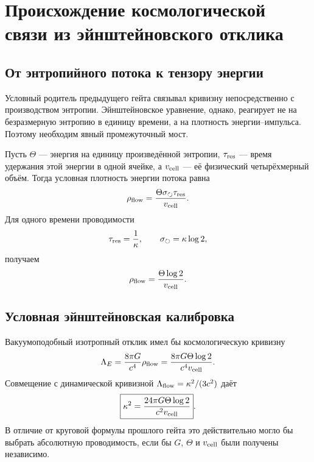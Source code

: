 \chapter{Происхождение космологической связи из эйнштейновского отклика}
\label{ch:v10-cosmological-einstein-response}

\section{От энтропийного потока к тензору энергии}

Условный родитель предыдущего гейта связывал кривизну непосредственно с
производством энтропии. Эйнштейновское уравнение, однако, реагирует не на
безразмерную энтропию в единицу времени, а на плотность энергии--импульса.
Поэтому необходим явный промежуточный мост.

Пусть $\Theta$ --- энергия на единицу произведённой энтропии,
$\tau_{\rm res}$ --- время удержания этой энергии в одной ячейке, а
$v_{\rm cell}$ --- её физический четырёхмерный объём. Тогда условная плотность
энергии потока равна
\begin{equation}
 \rho_{\rm flow}
 =\frac{\Theta\sigma_\circlearrowright\tau_{\rm res}}{v_{\rm cell}}.
 \label{eq:v10-einstein-flow-density}
\end{equation}
Для одного времени проводимости
\begin{equation}
 \tau_{\rm res}=\frac1\kappa,
 \qquad
 \sigma_\circlearrowright=\kappa\log2,
\end{equation}
получаем
\begin{equation}
 \rho_{\rm flow}=\frac{\Theta\log2}{v_{\rm cell}}.
 \label{eq:v10-einstein-one-cycle-density}
\end{equation}

\section{Условная эйнштейновская калибровка}

Вакуумоподобный изотропный отклик имел бы космологическую кривизну
\begin{equation}
 \Lambda_E=\frac{8\pi G}{c^4}\rho_{\rm flow}
 =\frac{8\pi G\Theta\log2}{c^4v_{\rm cell}}.
 \label{eq:v10-einstein-curvature-response}
\end{equation}
Совмещение с динамической кривизной
$\Lambda_{\rm flow}=\kappa^2/(3c^2)$ даёт
\begin{equation}
 \boxed{\kappa^2=\frac{24\pi G\Theta\log2}{c^2v_{\rm cell}}}.
 \label{eq:v10-einstein-conductance-scale}
\end{equation}
В отличие от круговой формулы прошлого гейта это действительно могло бы
выбрать абсолютную проводимость, если бы $G$, $\Theta$ и $v_{\rm cell}$ были
получены независимо.

